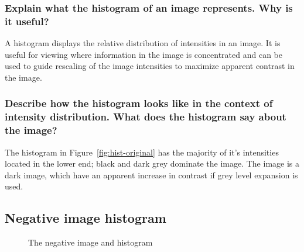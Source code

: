 \documentclass[article, 1.5space, letterpaper, 12pt, oneside, header, footer]{SydeClass}
\begin{document}
\subsubsection{Explain what the histogram of an image represents. Why is it useful?}

A histogram displays the relative distribution of intensities in an image. It is useful for viewing where information in the image is concentrated and can be used to guide rescaling of the image intensities to maximize apparent contrast in the image.

\subsubsection{Describe how the histogram looks like in the context of intensity distribution. What does the histogram say about the image?}

The histogram in Figure~\ref{fig:hist-original} has the majority of it's intensities located in the lower end; black and dark grey dominate the image. The image is a dark image, which have an apparent increase in contrast if grey level expansion is used.

\subsection{Negative image histogram}

\begin{figure}[ht]
\centering
	\caption{The negative image and histogram}
	\label{fig:hist-neg}
\end{figure}
\end{document}

